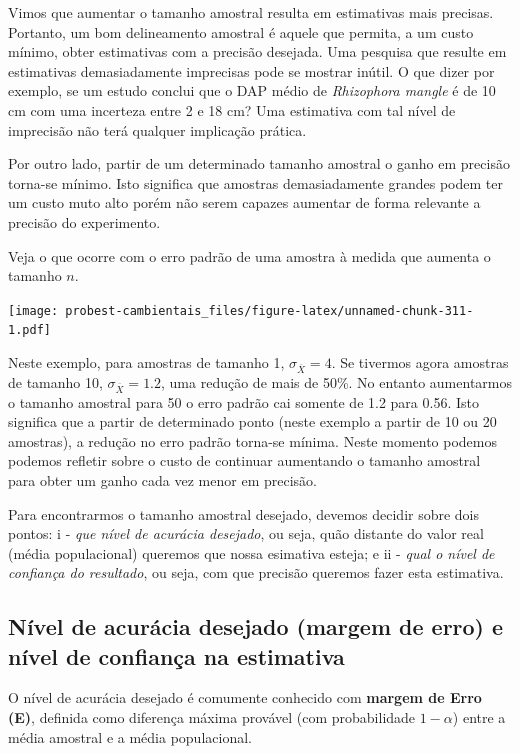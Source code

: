 \documentclass[
]{book}
\begin{document}
Vimos que aumentar o tamanho amostral resulta em estimativas mais precisas. Portanto, um bom delineamento amostral é aquele que permita, a um custo mínimo, obter estimativas com a precisão desejada. Uma pesquisa que resulte em estimativas demasiadamente imprecisas pode se mostrar inútil. O que dizer por exemplo, se um estudo conclui que o DAP médio de \emph{Rhizophora mangle} é de 10 cm com uma incerteza entre 2 e 18 cm? Uma estimativa com tal nível de imprecisão não terá qualquer implicação prática.

Por outro lado, partir de um determinado tamanho amostral o ganho em precisão torna-se mínimo. Isto significa que amostras demasiadamente grandes podem ter um custo muto alto porém não serem capazes aumentar de forma relevante a precisão do experimento.

Veja o que ocorre com o erro padrão de uma amostra à medida que aumenta o tamanho \(n\).

\texttt{[image: probest-cambientais\_files/figure-latex/unnamed-chunk-311-1.pdf]}

Neste exemplo, para amostras de tamanho 1, \(\sigma_{\overline{X}} = 4\). Se tivermos agora amostras de tamanho 10, \(\sigma_{\overline{X}} = 1.2\), uma redução de mais de 50\%. No entanto aumentarmos o tamanho amostral para 50 o erro padrão cai somente de 1.2 para 0.56. Isto significa que a partir de determinado ponto (neste exemplo a partir de 10 ou 20 amostras), a redução no erro padrão torna-se mínima. Neste momento podemos podemos refletir sobre o custo de continuar aumentando o tamanho amostral para obter um ganho cada vez menor em precisão.

Para encontrarmos o tamanho amostral desejado, devemos decidir sobre dois pontos: i - \emph{que nível de acurácia desejado}, ou seja, quão distante do valor real (média populacional) queremos que nossa esimativa esteja; e ii - \emph{qual o nível de confiança do resultado}, ou seja, com que precisão queremos fazer esta estimativa.

\hypertarget{nuxedvel-de-acuruxe1cia-desejado-margem-de-erro-e-nuxedvel-de-confianuxe7a-na-estimativa}{%
\subsection{Nível de acurácia desejado (margem de erro) e nível de confiança na estimativa}\label{nuxedvel-de-acuruxe1cia-desejado-margem-de-erro-e-nuxedvel-de-confianuxe7a-na-estimativa}}

O nível de acurácia desejado é comumente conhecido com \textbf{margem de Erro (E)}, definida como diferença máxima provável (com probabilidade \(1-\alpha\)) entre a média amostral e a média populacional.
\end{document}
